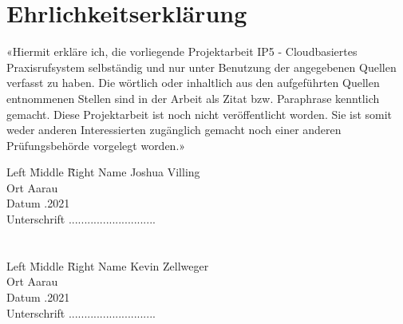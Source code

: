 \clearpage
\section{Ehrlichkeitserklärung}

«Hiermit erkläre ich, die vorliegende Projektarbeit IP5 - Cloudbasiertes Praxisrufsystem selbständig und nur unter Benutzung der angegebenen Quellen verfasst zu haben.
Die wörtlich oder inhaltlich aus den aufgeführten Quellen entnommenen Stellen sind in der Arbeit als Zitat bzw. Paraphrase kenntlich gemacht.
Diese Projektarbeit ist noch nicht veröffentlicht worden.
Sie ist somit weder anderen Interessierten zugänglich gemacht noch einer anderen Prüfungsbehörde vorgelegt worden.»

\begin{tabbing}
    Left \= Middle \=  \= Right \kill
    Name \> \> \>    Joshua Villing\\
    Ort \> \> \>    Aarau \\
    Datum \> \> .2021\\
    Unterschrift \> \> \>     ............................\\
    \\
    \\
    Left \= Middle \= Right \kill
    Name \> \> \>    Kevin Zellweger\\
    Ort \> \>\>    Aarau\\
    Datum \> \> .2021\\
    Unterschrift \> \> \>    ............................\\
\end{tabbing}

